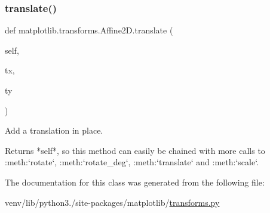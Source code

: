 \subsubsection{\texorpdfstring{translate()}{translate()}}
{\footnotesize\ttfamily def matplotlib.\+transforms.\+Affine2\+D.\+translate (\begin{DoxyParamCaption}\item[{}]{self,  }\item[{}]{tx,  }\item[{}]{ty }\end{DoxyParamCaption})}

\begin{DoxyVerb}Add a translation in place.

Returns *self*, so this method can easily be chained with more
calls to :meth:`rotate`, :meth:`rotate_deg`, :meth:`translate`
and :meth:`scale`.
\end{DoxyVerb}
 

The documentation for this class was generated from the following file\+:\begin{DoxyCompactItemize}
\item 
venv/lib/python3./site-\/packages/matplotlib/\hyperlink{transforms_8py}{transforms.\+py}\end{DoxyCompactItemize}
